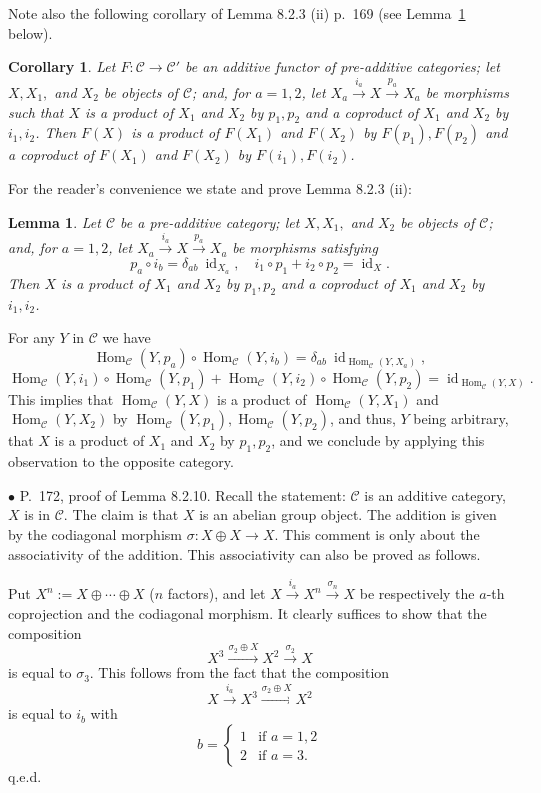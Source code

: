 \documentclass[12pt]{article}
\newtheorem{lem}[thm]{Lemma}
\newtheorem{cor}[thm]{Corollary}
\theoremstyle{remark}
\newcommand{\bu}{\bullet}
\newcommand{\n}{\noindent}
\newcommand{\C}{\mathcal C}
\newcommand{\xr}{\xrightarrow}
\DeclareMathOperator{\id}{id}
\DeclareMathOperator{\h}{Hom}
\begin{document}
Note also the following corollary of Lemma 8.2.3 (ii) p.~169 (see Lemma~\ref{823ii} below). 
%
\begin{cor}\label{823b}
Let $F:\C\to\C'$ be an additive functor of pre-additive categories; let $X,X_1,$ and $X_2$ be objects of $\C$; and, for $a=1,2$, let $X_a\xr{i_a}X\xr{p_a}X_a$ be morphisms such that $X$ is a product of $X_1$ and $X_2$ by $p_1,p_2$ and a coproduct of $X_1$ and $X_2$ by $i_1,i_2$. Then $F(X)$ is a product of $F(X_1)$ and $F(X_2)$ by $F(p_1),F(p_2)$ and a coproduct of $F(X_1)$ and $F(X_2)$ by $F(i_1),F(i_2)$. 
\end{cor}

For the reader's convenience we state and prove Lemma 8.2.3 (ii):
%
\begin{lem}\label{823ii}
Let $\C$ be a pre-additive category; let $X,X_1,$ and $X_2$ be objects of $\C$; and, for $a=1,2$, let $X_a\xr{i_a}X\xr{p_a}X_a$ be morphisms satisfying 
$$
p_a\circ i_b=\delta_{ab}\ \id_{X_a},\quad i_1\circ p_1+i_2\circ p_2=\id_X.
$$
Then $X$ is a product of $X_1$ and $X_2$ by $p_1,p_2$ and a coproduct of $X_1$ and $X_2$ by $i_1,i_2$. 
\end{lem}
%
\n{\em Proof.} For any $Y$ in $\C$ we have 
$$
\h_\C(Y,p_a)\circ\h_\C(Y,i_b)=\delta_{ab}\ \id_{\h_\C(Y,X_a)},
$$ 
$$
\h_\C(Y,i_1)\circ\h_\C(Y,p_1)+\h_\C(Y,i_2)\circ\h_\C(Y,p_2)=\id_{\h_\C(Y,X)}.
$$ 
This implies that $\h_\C(Y,X)$ is a product of $\h_\C(Y,X_1)$ and $\h_\C(Y,X_2)$ by $\h_\C(Y,p_1),\h_\C(Y,p_2)$, and thus, $Y$ being arbitrary, that $X$ is a product of $X_1$ and $X_2$ by $p_1,p_2$, and we conclude by applying this observation to the opposite category. 


\n$\bu$ P.~172, proof of Lemma 8.2.10. Recall the statement: $\C$ is an additive category, $X$ is in $\C$. The claim is that $X$ is an abelian group object. The addition is given by the codiagonal morphism $\sigma:X\oplus X\to X$. This comment is only about the associativity of the addition. This associativity can also be proved as follows. 

Put $X^n:=X\oplus\cdots\oplus X$ ($n$ factors), and let $X\xr{i_a}X^n\xr{\sigma_n}X$ be respectively the $a$-th coprojection and the codiagonal morphism. It clearly suffices to show that the composition 
$$
X^3\xr{\sigma_2\oplus X}X^2\xr{\sigma_2}X
$$ 
is equal to $\sigma_3$. This follows from the fact that the composition 
$$
X\xr{i_a}X^3\xr{\sigma_2\oplus X}X^2
$$ 
is equal to $i_b$ with 
$$
b=\begin{cases}1&\text{if }a=1,2\\2&\text{if }a=3.\end{cases}
$$ 
q.e.d. 
\end{document}
